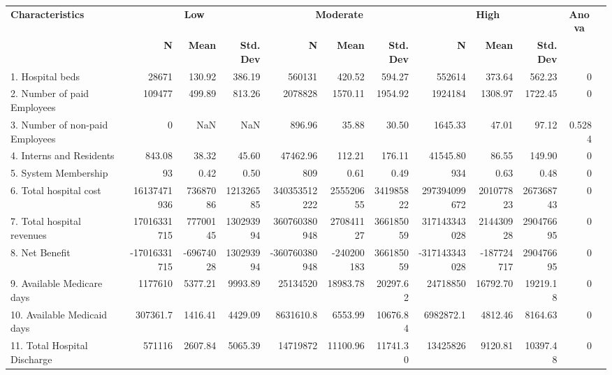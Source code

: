 \documentclass{article}
\begin{document}
\begin{landscape}
		\begin{table}[ht]
			\centering
			\small
				\begin{tabular}{p{3cm}rrr|rrr|rrr|rr}
					\toprule
					\textbf{Characteristics} & \multicolumn{3}{c}{\textbf{Low}} & \multicolumn{3}{c}{\textbf{Moderate}} & \multicolumn{3}{c}{\textbf{High}} & \multicolumn{1}{c}{\textbf{Anova}} \\
					\cmidrule(lr){2-4} \cmidrule(lr){5-7} \cmidrule(lr){8-10} \cmidrule(lr){11-11}
					& \textbf{N} & \textbf{Mean} & \textbf{Std. Dev} & \textbf{N} & \textbf{Mean} & \textbf{Std. Dev} & \textbf{N} & \textbf{Mean} & \textbf{Std. Dev} & \\
					\midrule
					1. Hospital beds & 28671 & 130.92 & 386.19 & 560131 & 420.52 & 594.27 & 552614 & 373.64 & 562.23 & 0 \\
					2. Number of paid Employees & 109477 & 499.89 & 813.26 & 2078828 & 1570.11 & 1954.92 & 1924184 & 1308.97 & 1722.45 & 0 \\
					3. Number of non-paid Employees & 0 & NaN & NaN & 896.96 & 35.88 & 30.50 & 1645.33 & 47.01 & 97.12 & 0.5284 \\
					4. Interns and Residents & 843.08 & 38.32 & 45.60 & 47462.96 & 112.21 & 176.11 & 41545.80 & 86.55 & 149.90 & 0 \\
					5. System Membership & 93 & 0.42 & 0.50 & 809 & 0.61 & 0.49 & 934 & 0.63 & 0.48 & 0 \\
					\midrule
					6. Total hospital cost & 16137471936 & 73687086 & 121326585 & 340353512222 & 255520655 & 341985822 & 297394099672 & 201077823 & 267368743 & 0 \\
					7. Total hospital revenues & 17016331715 & 77700145 & 130293994 & 360760380948 & 270841127 & 366185059 & 317143343028 & 214430928 & 290476695 & 0 \\
					8. Net Benefit & -17016331715 & -69674028 & 130293994 & -360760380948 & -240200183 & 366185059 & -317143343028 & -187724717 & 290476695 & 0 \\
					9. Available Medicare days & 1177610 & 5377.21 & 9993.89 & 25134520 & 18983.78 & 20297.62 & 24718850 & 16792.70 & 19219.18 & 0 \\
					10. Available Medicaid days & 307361.7 & 1416.41 & 4429.09 & 8631610.8 & 6553.99 & 10676.84 & 6982872.1 & 4812.46 & 8164.63 & 0 \\
					11. Total Hospital Discharge & 571116 & 2607.84 & 5065.39 & 14719872 & 11100.96 & 11741.30 & 13425826 & 9120.81 & 10397.48 & 0 \\

\end{tabular}
\end{table}
\end{landscape}
\end{document}
